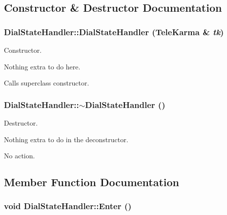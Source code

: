 \subsection{Constructor \& Destructor Documentation}
\hypertarget{classDialStateHandler_f0dfbbd00faaa0acd869655c510b6e72}{
\subsubsection[{DialStateHandler}]{\setlength{\rightskip}{0pt plus 5cm}DialStateHandler::DialStateHandler ({\bf TeleKarma} \& {\em tk})}}
\label{classDialStateHandler_f0dfbbd00faaa0acd869655c510b6e72}


Constructor. 

Nothing extra to do here.

Calls superclass constructor.\hypertarget{classDialStateHandler_e2ea834e79a07ec0083b08e51b5f0b25}{
\subsubsection[{$\sim$DialStateHandler}]{\setlength{\rightskip}{0pt plus 5cm}DialStateHandler::$\sim$DialStateHandler ()}}
\label{classDialStateHandler_e2ea834e79a07ec0083b08e51b5f0b25}


Destructor. 

Nothing extra to do in the deconstructor.

No action.

\subsection{Member Function Documentation}
\hypertarget{classDialStateHandler_945709f5589569cf5441b1c779efed7c}{
\subsubsection[{Enter}]{\setlength{\rightskip}{0pt plus 5cm}void DialStateHandler::Enter ()}}
\label{classDialStateHandler_945709f5589569cf5441b1c779efed7c}


